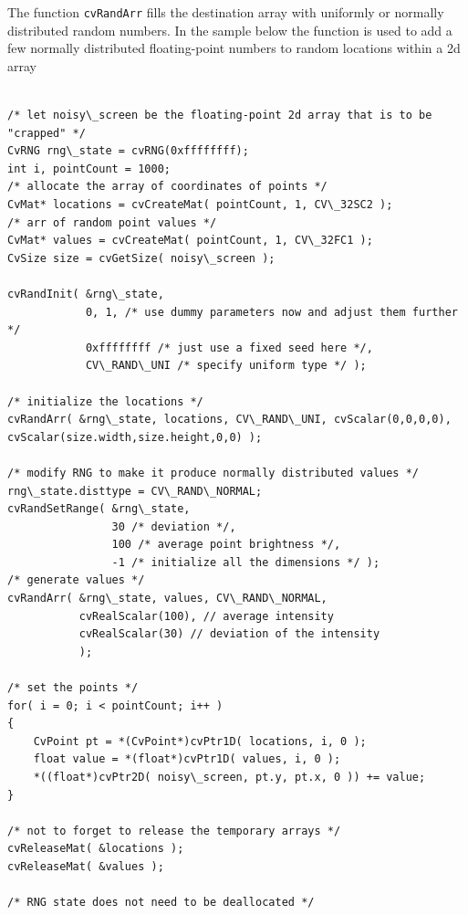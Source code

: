 \begin{description}
\end{description}

The function \texttt{cvRandArr} fills the destination array with uniformly
or normally distributed random numbers. In the sample below the function
is used to add a few normally distributed floating-point numbers to
random locations within a 2d array

\begin{lstlisting}

/* let noisy\_screen be the floating-point 2d array that is to be "crapped" */
CvRNG rng\_state = cvRNG(0xffffffff);
int i, pointCount = 1000;
/* allocate the array of coordinates of points */
CvMat* locations = cvCreateMat( pointCount, 1, CV\_32SC2 );
/* arr of random point values */
CvMat* values = cvCreateMat( pointCount, 1, CV\_32FC1 );
CvSize size = cvGetSize( noisy\_screen );

cvRandInit( &rng\_state,
            0, 1, /* use dummy parameters now and adjust them further */
            0xffffffff /* just use a fixed seed here */,
            CV\_RAND\_UNI /* specify uniform type */ );

/* initialize the locations */
cvRandArr( &rng\_state, locations, CV\_RAND\_UNI, cvScalar(0,0,0,0), cvScalar(size.width,size.height,0,0) );

/* modify RNG to make it produce normally distributed values */
rng\_state.disttype = CV\_RAND\_NORMAL;
cvRandSetRange( &rng\_state,
                30 /* deviation */,
                100 /* average point brightness */,
                -1 /* initialize all the dimensions */ );
/* generate values */
cvRandArr( &rng\_state, values, CV\_RAND\_NORMAL,
           cvRealScalar(100), // average intensity
           cvRealScalar(30) // deviation of the intensity
           );

/* set the points */
for( i = 0; i < pointCount; i++ )
{
    CvPoint pt = *(CvPoint*)cvPtr1D( locations, i, 0 );
    float value = *(float*)cvPtr1D( values, i, 0 );
    *((float*)cvPtr2D( noisy\_screen, pt.y, pt.x, 0 )) += value;
}

/* not to forget to release the temporary arrays */
cvReleaseMat( &locations );
cvReleaseMat( &values );

/* RNG state does not need to be deallocated */

\end{lstlisting}


